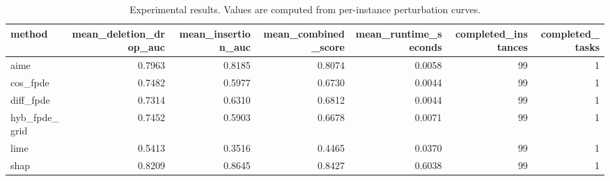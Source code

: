 \begin{table}[t]
\caption{Experimental results. Values are computed from per-instance perturbation curves.}
\label{tab:main_results_computed}
\centering
\begin{tabular}{lrrrrrr}
\toprule
method & mean\_deletion\_drop\_auc & mean\_insertion\_auc & mean\_combined\_score & mean\_runtime\_seconds & completed\_instances & completed\_tasks \\
\midrule
aime & 0.7963 & 0.8185 & 0.8074 & 0.0058 & 99 & 1 \\
cos\_fpde & 0.7482 & 0.5977 & 0.6730 & 0.0044 & 99 & 1 \\
diff\_fpde & 0.7314 & 0.6310 & 0.6812 & 0.0044 & 99 & 1 \\
hyb\_fpde\_grid & 0.7452 & 0.5903 & 0.6678 & 0.0071 & 99 & 1 \\
lime & 0.5413 & 0.3516 & 0.4465 & 0.0370 & 99 & 1 \\
shap & 0.8209 & 0.8645 & 0.8427 & 0.6038 & 99 & 1 \\
\bottomrule
\end{tabular}

\end{table}
